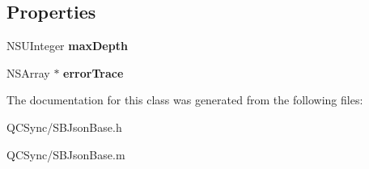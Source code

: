 \subsection*{Properties}
\begin{DoxyCompactItemize}
\item 
\hypertarget{interface_s_b_json_base_abe3e47517711570a9a57e2d92a15055b}{
NSUInteger {\bfseries maxDepth}}
\label{interface_s_b_json_base_abe3e47517711570a9a57e2d92a15055b}

\item 
\hypertarget{interface_s_b_json_base_aa83f0ee5efade2fd26ddf6591ffd8dc0}{
NSArray $\ast$ {\bfseries errorTrace}}
\label{interface_s_b_json_base_aa83f0ee5efade2fd26ddf6591ffd8dc0}

\end{DoxyCompactItemize}


The documentation for this class was generated from the following files:\begin{DoxyCompactItemize}
\item 
QCSync/SBJsonBase.h\item 
QCSync/SBJsonBase.m\end{DoxyCompactItemize}
